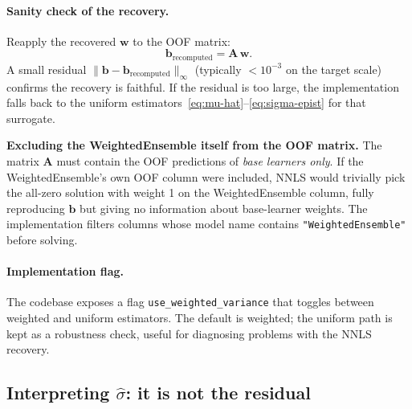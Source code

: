 \documentclass[11pt,a4paper]{article}
\begin{document}
\paragraph{Sanity check of the recovery.} Reapply the recovered $\bm w$ to the OOF matrix:
\[
\bm b_{\text{recomputed}} = \mathbf{A} \, \bm w.
\]
A small residual $\|\bm b - \bm b_{\text{recomputed}}\|_\infty$ (typically $< 10^{-3}$ on the target scale) confirms the recovery is faithful. If the residual is too large, the implementation falls back to the uniform estimators~\eqref{eq:mu-hat}--\eqref{eq:sigma-epist} for that surrogate.

\begin{cautionbox}
\textbf{Excluding the WeightedEnsemble itself from the OOF matrix.} The matrix $\mathbf{A}$ must contain the OOF predictions of \emph{base learners only}. If the WeightedEnsemble's own OOF column were included, NNLS would trivially pick the all-zero solution with weight 1 on the WeightedEnsemble column, fully reproducing $\bm b$ but giving no information about base-learner weights. The implementation filters columns whose model name contains \texttt{"WeightedEnsemble"} before solving.
\end{cautionbox}

\paragraph{Implementation flag.} The codebase exposes a flag \texttt{use\_weighted\_variance} that toggles between weighted and uniform estimators. The default is weighted; the uniform path is kept as a robustness check, useful for diagnosing problems with the NNLS recovery.

\subsection{Interpreting \texorpdfstring{$\hat\sigma$}{sigma-hat}: it is not the residual}
\end{document}
